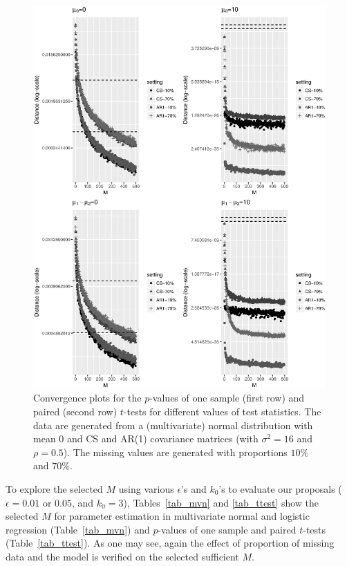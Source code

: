 \documentclass[11pt,a5paper,twoside]{book}
\begin{document}
{{\begin{figure}
	\centering
	\includegraphics[width=\textwidth]{figttestMM.eps}
	\caption[Convergence plots for the $p$-values of one sample and paired $t$-tests for different values of test statistics]{Convergence plots for the $p$-values of one sample (first row) and paired (second row) $t$-tests for different values of test statistics. The data are generated from a (multivariate) normal distribution with mean $0$ and CS and AR(1) covariance matrices (with $\sigma^2=16$ and $\rho=0.5$). The missing values are generated with proportions $10\%$ and $70\%$. {\color{black}{The two horizontal dashed lines are $\epsilon = 0.005, 0.0005$, respectively.}}}
	\label{fig_ttest}
\end{figure} 


To explore the selected $M$ using various $\epsilon$'s and $k_0$'s to evaluate our proposals ($\epsilon=0.01$ or $0.05$, and $k_0=3$), Tables~\ref{tab_mvn} and \ref{tab_ttest} show the selected $M$ for parameter estimation in multivariate normal and logistic regression (Table~\ref{tab_mvn}) and $p$-values of one sample and paired $t$-tests (Table~\ref{tab_ttest}). As one may see, again the effect of proportion of missing data and the model is verified on the selected sufficient $M$. {\color{black}{While a dataset with a larger proportion of missing data needs a larger $M$, the number of sufficient imputed datasets in case of logistic regression is different from multivariate normal, even for a smaller proportion of missing data. This would highlight the role of a procedure that accounts for all of these aspects.}}


}}
\end{document}
